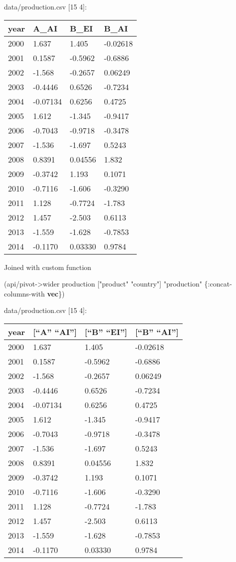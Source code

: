 \documentclass[]{article}
\newenvironment{Shaded}{\begin{snugshade}}{\end{snugshade}}
\newcommand{\KeywordTok}[1]{\textcolor[rgb]{0.13,0.29,0.53}{\textbf{#1}}}
\newcommand{\StringTok}[1]{\textcolor[rgb]{0.31,0.60,0.02}{#1}}
\newcommand{\AttributeTok}[1]{\textcolor[rgb]{0.77,0.63,0.00}{#1}}
\newcommand{\NormalTok}[1]{#1}
\begin{document}
data/production.csv {[}15 4{]}:

\begin{longtable}[]{@{}llll@{}}
\toprule
year & A\_AI & B\_EI & B\_AI\tabularnewline
\midrule
\endhead
2000 & 1.637 & 1.405 & -0.02618\tabularnewline
2001 & 0.1587 & -0.5962 & -0.6886\tabularnewline
2002 & -1.568 & -0.2657 & 0.06249\tabularnewline
2003 & -0.4446 & 0.6526 & -0.7234\tabularnewline
2004 & -0.07134 & 0.6256 & 0.4725\tabularnewline
2005 & 1.612 & -1.345 & -0.9417\tabularnewline
2006 & -0.7043 & -0.9718 & -0.3478\tabularnewline
2007 & -1.536 & -1.697 & 0.5243\tabularnewline
2008 & 0.8391 & 0.04556 & 1.832\tabularnewline
2009 & -0.3742 & 1.193 & 0.1071\tabularnewline
2010 & -0.7116 & -1.606 & -0.3290\tabularnewline
2011 & 1.128 & -0.7724 & -1.783\tabularnewline
2012 & 1.457 & -2.503 & 0.6113\tabularnewline
2013 & -1.559 & -1.628 & -0.7853\tabularnewline
2014 & -0.1170 & 0.03330 & 0.9784\tabularnewline
\bottomrule
\end{longtable}

Joined with custom function

\begin{Shaded}
\begin{Highlighting}[]
\NormalTok{(api/pivot->wider production [}\StringTok{"product"} \StringTok{"country"}\NormalTok{] }\StringTok{"production"}\NormalTok{ \{}\AttributeTok{:concat-columns-with} \KeywordTok{vec}\NormalTok{\})}
\end{Highlighting}
\end{Shaded}

data/production.csv {[}15 4{]}:

\begin{longtable}[]{@{}llll@{}}
\toprule
year & {[}``A'' ``AI''{]} & {[}``B'' ``EI''{]} & {[}``B''
``AI''{]}\tabularnewline
\midrule
\endhead
2000 & 1.637 & 1.405 & -0.02618\tabularnewline
2001 & 0.1587 & -0.5962 & -0.6886\tabularnewline
2002 & -1.568 & -0.2657 & 0.06249\tabularnewline
2003 & -0.4446 & 0.6526 & -0.7234\tabularnewline
2004 & -0.07134 & 0.6256 & 0.4725\tabularnewline
2005 & 1.612 & -1.345 & -0.9417\tabularnewline
2006 & -0.7043 & -0.9718 & -0.3478\tabularnewline
2007 & -1.536 & -1.697 & 0.5243\tabularnewline
2008 & 0.8391 & 0.04556 & 1.832\tabularnewline
2009 & -0.3742 & 1.193 & 0.1071\tabularnewline
2010 & -0.7116 & -1.606 & -0.3290\tabularnewline
2011 & 1.128 & -0.7724 & -1.783\tabularnewline
2012 & 1.457 & -2.503 & 0.6113\tabularnewline
2013 & -1.559 & -1.628 & -0.7853\tabularnewline
2014 & -0.1170 & 0.03330 & 0.9784\tabularnewline
\bottomrule
\end{longtable}
\end{document}
